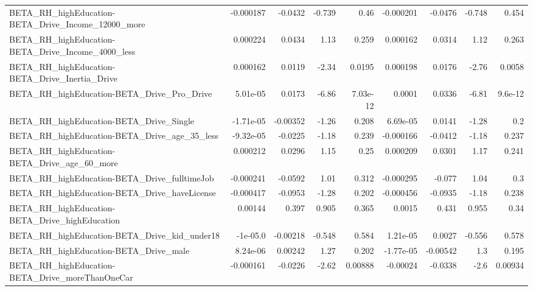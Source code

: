 \begin{tabular}{lrrrrrrrr}
BETA\_RH\_highEducation-BETA\_Drive\_Income\_12000\_more &   -0.000187 &      -0.0432 &   -0.739 &     0.46 &  -0.000201 &     -0.0476 &       -0.748 &         0.454 \\
BETA\_RH\_highEducation-BETA\_Drive\_Income\_4000\_less  &    0.000224 &       0.0434 &     1.13 &    0.259 &   0.000162 &      0.0314 &         1.12 &         0.263 \\
BETA\_RH\_highEducation-BETA\_Drive\_Inertia\_Drive     &    0.000162 &       0.0119 &    -2.34 &   0.0195 &   0.000198 &      0.0176 &        -2.76 &        0.0058 \\
BETA\_RH\_highEducation-BETA\_Drive\_Pro\_Drive         &    5.01e-05 &       0.0173 &    -6.86 & 7.03e-12 &     0.0001 &      0.0336 &        -6.81 &       9.6e-12 \\
BETA\_RH\_highEducation-BETA\_Drive\_Single            &   -1.71e-05 &     -0.00352 &    -1.26 &    0.208 &   6.69e-05 &      0.0141 &        -1.28 &           0.2 \\
BETA\_RH\_highEducation-BETA\_Drive\_age\_35\_less       &   -9.32e-05 &      -0.0225 &    -1.18 &    0.239 &  -0.000166 &     -0.0412 &        -1.18 &         0.237 \\
BETA\_RH\_highEducation-BETA\_Drive\_age\_60\_more       &    0.000212 &       0.0296 &     1.15 &     0.25 &   0.000209 &      0.0301 &         1.17 &         0.241 \\
BETA\_RH\_highEducation-BETA\_Drive\_fulltimeJob       &   -0.000241 &      -0.0592 &     1.01 &    0.312 &  -0.000295 &      -0.077 &         1.04 &           0.3 \\
BETA\_RH\_highEducation-BETA\_Drive\_haveLicense       &   -0.000417 &      -0.0953 &    -1.28 &    0.202 &  -0.000456 &     -0.0935 &        -1.18 &         0.238 \\
BETA\_RH\_highEducation-BETA\_Drive\_highEducation     &     0.00144 &        0.397 &    0.905 &    0.365 &     0.0015 &       0.431 &        0.955 &          0.34 \\
BETA\_RH\_highEducation-BETA\_Drive\_kid\_under18       &    -1e-05.0 &     -0.00218 &   -0.548 &    0.584 &   1.21e-05 &      0.0027 &       -0.556 &         0.578 \\
BETA\_RH\_highEducation-BETA\_Drive\_male              &    8.24e-06 &      0.00242 &     1.27 &    0.202 &  -1.77e-05 &    -0.00542 &          1.3 &         0.195 \\
BETA\_RH\_highEducation-BETA\_Drive\_moreThanOneCar    &   -0.000161 &      -0.0226 &    -2.62 &  0.00888 &   -0.00024 &     -0.0338 &         -2.6 &       0.00934 \\

\end{tabular}
